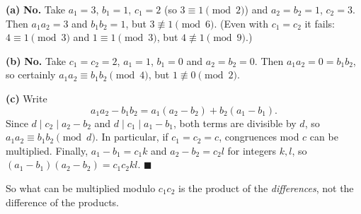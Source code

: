 \textbf{(a)} \textbf{No.} Take $a_1=3$, $b_1=1$, $c_1=2$ (so $3\equiv1\pmod2$) and $a_2=b_2=1$, $c_2=3$. Then $a_1a_2=3$ and $b_1b_2=1$, but $3\not\equiv1\pmod6$. (Even with $c_1=c_2$ it fails: $4\equiv1\pmod3$ and $1\equiv1\pmod3$, but $4\not\equiv1\pmod9$.)

\textbf{(b)} \textbf{No.} Take $c_1=c_2=2$, $a_1=1$, $b_1=0$ and $a_2=b_2=0$. Then $a_1a_2=0=b_1b_2$, so certainly $a_1a_2\equiv b_1b_2\pmod4$, but $1\not\equiv0\pmod2$.

\textbf{(c)} Write
\[a_1a_2-b_1b_2=a_1(a_2-b_2)+b_2(a_1-b_1).\]
Since $d\mid c_2\mid a_2-b_2$ and $d\mid c_1\mid a_1-b_1$, both terms are divisible by $d$, so $a_1a_2\equiv b_1b_2\pmod d$. In particular, if $c_1=c_2=c$, congruences mod $c$ can be multiplied. Finally, $a_1-b_1=c_1k$ and $a_2-b_2=c_2l$ for integers $k,l$, so $(a_1-b_1)(a_2-b_2)=c_1c_2kl$. $\blacksquare$

So what can be multiplied modulo $c_1c_2$ is the product of the \emph{differences}, not the difference of the products.
